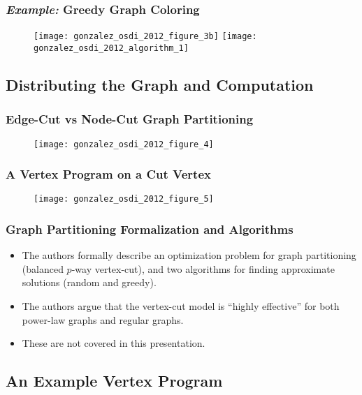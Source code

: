 \begin{frame}
  \frametitle{\textit{Example:} Greedy Graph Coloring}
  \begin{figure}
    \centering
    \texttt{[image: gonzalez\_osdi\_2012\_figure\_3b]}%
    \texttt{[image: gonzalez\_osdi\_2012\_algorithm\_1]}
    \caption{\cite[OSDI '12]{gonzalez2012powergraph}}
  \end{figure}
\end{frame}


\subsection{Distributing the Graph and Computation}

\begin{frame}
  \frametitle{Edge-Cut vs Node-Cut Graph Partitioning}
  \begin{figure}
    \centering
    \texttt{[image: gonzalez\_osdi\_2012\_figure\_4]}
    \caption{\cite[OSDI '12]{gonzalez2012powergraph}}
  \end{figure}
\end{frame}

\begin{frame}
  \frametitle{A Vertex Program on a Cut Vertex}
  \begin{figure}
    \centering
    \texttt{[image: gonzalez\_osdi\_2012\_figure\_5]}
    \caption{\cite[OSDI '12]{gonzalez2012powergraph}}
  \end{figure}
\end{frame}

\begin{frame}
  \frametitle{Graph Partitioning Formalization and Algorithms}
  \begin{itemize}
    \item The authors formally describe an optimization problem for graph
          partitioning (balanced $p$-way vertex-cut), and two algorithms for
          finding approximate solutions (random and greedy).
    \item The authors argue that the vertex-cut model is ``highly effective''
          for both power-law graphs and regular graphs.~\cite[OSDI '12]{gonzalez2012powergraph}
    \item These are not covered in this presentation.
  \end{itemize}
\end{frame}


\subsection{An Example Vertex Program}

